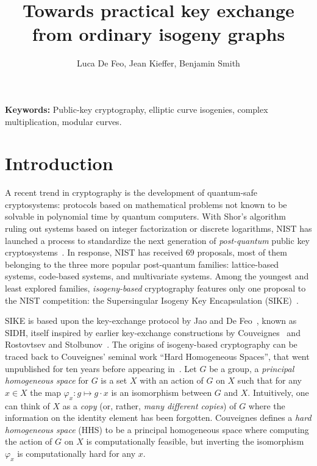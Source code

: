 \documentclass{article}
\title{Towards practical key exchange from ordinary isogeny graphs}
\author{Luca De Feo, Jean Kieffer, Benjamin Smith}
\theoremstyle{definition}
\begin{document}
\maketitle

\begin{abstract}
\end{abstract}

\textbf{Keywords:} Public-key cryptography, elliptic curve isogenies,
complex multiplication, modular curves.

\section{Introduction}
\label{sec:introduction}

A recent trend in cryptography is the development of quantum-safe
cryptosystems: protocols based on mathematical problems not known to
be solvable in polynomial time by quantum computers. With Shor's
algorithm~\cite{shor1994algorithms} ruling out systems based on
integer factorization or discrete logarithms, NIST has launched a
process to standardize the next generation of \emph{post-quantum}
public key cryptosystems~\cite{NIST2016}. In response, NIST has
received 69 proposals, most of them belonging to the three more
popular post-quantum families: lattice-based systems, code-based
systems, and multivariate systems. Among the youngest and least
explored families, \emph{isogeny-based} cryptography features only one
proposal to the NIST competition: the Supersingular Isogeny Key
Encapsulation (SIKE)~\cite{SIKE}.

SIKE is based upon the key-exchange protocol by Jao and De
Feo~\cite{jao+defeo2011}, known as SIDH, itself inspired by earlier
key-exchange constructions by Couveignes~\cite{cryptoeprint:2006:291}
and Rostovtsev and
Stolbunov~\cite{rostovtsev+stolbunov06,stolbunov-red,Stol}. The
origins of isogeny-based cryptography can be traced back to
Couveignes' seminal work ``Hard Homogeneous Spaces'', that went
unpublished for ten years before appearing
in~\cite{cryptoeprint:2006:291}. Let $G$ be a group, a \emph{principal
  homogeneous space} for $G$ is a set $X$ with an
action of $G$ on $X$ such that for any $x∈X$ the map $φ_x:g↦g·x$ is an
isomorphism between $G$ and $X$. Intuitively, one can think of $X$ as
a \emph{copy} (or, rather, \emph{many different copies}) of $G$ where
the information on the identity element has been forgotten. Couveignes
defines a \emph{hard homogeneous space} (HHS) to be a principal
homogeneous space where computing
the action of $G$ on $X$ is computationally feasible, but inverting
the isomorphism $φ_x$ is computationally hard for any $x$.
\end{document}
